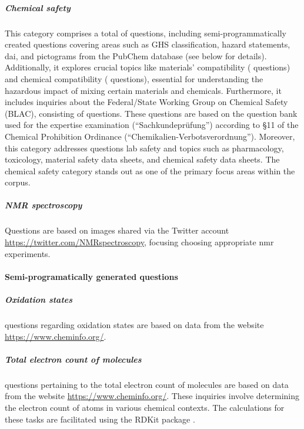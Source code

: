 \documentclass[11pt, oneside]{article}
\begin{document}
\subparagraph{Chemical safety} 
This category comprises a total of  questions, including semi-programmatically created questions covering areas such as GHS classification, hazard statements, \gls{dai}, and pictograms from the PubChem database \cite{pubchem} (see below for details). 
Additionally, it explores crucial topics like materials' compatibility ( questions) and chemical compatibility ( questions), essential for understanding the hazardous impact of mixing certain materials and chemicals. 
Furthermore, it includes inquiries about the Federal/State Working Group on Chemical Safety (BLAC), consisting of  questions. 
These questions are based on the question bank used for the expertise examination (\enquote{Sachkundeprüfung}) according to §11 of the Chemical Prohibition Ordinance (\enquote{Chemikalien-Verbotsverordnung}).
Moreover, this category addresses questions lab safety and topics such as pharmacology, toxicology, material safety data sheets, and chemical safety data sheets. 
The chemical safety category stands out as one of the primary focus areas within the \chembench corpus.

\subparagraph{NMR spectroscopy}
Questions are based on images shared via the Twitter account \url{https://twitter.com/NMRspectroscopy}, focusing choosing appropriate \gls{nmr} experiments.


\paragraph{Semi-programatically generated questions}

\subparagraph{Oxidation states}
 questions regarding oxidation states are based on data from the website \url{https://www.cheminfo.org/}. 

\subparagraph{Total electron count of molecules}
 questions pertaining to the total electron count of molecules are based on data from the website \url{https://www.cheminfo.org/}. 
These inquiries involve determining the electron count of atoms in various chemical contexts. The calculations for these tasks are facilitated using the RDKit package \cite{rdkit}.
\end{document}
